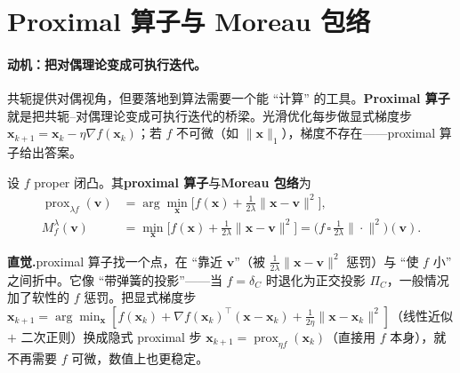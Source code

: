 \section{Proximal 算子与 Moreau 包络}
\label{sec:cvx-prox}

\paragraph{动机：把对偶理论变成可执行迭代。}
共轭提供对偶视角，但要落地到算法需要一个能 “计算” 的工具。\textbf{Proximal 算子}就是把共轭--对偶理论变成可执行迭代的桥梁。光滑优化每步做显式梯度步 $\mathbf x_{k+1}=\mathbf x_k-\eta\nabla f(\mathbf x_k)$；若 $f$ 不可微（如 $\|\mathbf x\|_1$），梯度不存在——proximal 算子给出答案。

\begin{definition}\label{def:prox}
设 $f$ proper 闭凸。其\textbf{proximal 算子}与\textbf{Moreau 包络}为
\begin{align}
  \operatorname{prox}_{\lambda f}(\mathbf v)&=\arg\min_{\mathbf x}\Big[f(\mathbf x)+\frac1{2\lambda}\|\mathbf x-\mathbf v\|^2\Big],\label{eq:prox-def}\\
  M_f^\lambda(\mathbf v)&=\min_{\mathbf x}\Big[f(\mathbf x)+\frac1{2\lambda}\|\mathbf x-\mathbf v\|^2\Big]=\big(f\,\square\,\tfrac1{2\lambda}\|\cdot\|^2\big)(\mathbf v).\label{eq:moreau-def}
\end{align}
\end{definition}

\noindent\textbf{直觉.}\;proximal 算子找一个点，在 “靠近 $\mathbf v$”（被 $\tfrac1{2\lambda}\|\mathbf x-\mathbf v\|^2$ 惩罚）与 “使 $f$ 小” 之间折中。它像 “带弹簧的投影”——当 $f=\delta_C$ 时退化为正交投影 $\Pi_C$，一般情况加了软性的 $f$ 惩罚。把显式梯度步 $\mathbf x_{k+1}=\arg\min_{\mathbf x}[f(\mathbf x_k)+\nabla f(\mathbf x_k)^\top(\mathbf x-\mathbf x_k)+\tfrac1{2\eta}\|\mathbf x-\mathbf x_k\|^2]$（线性近似 $+$ 二次正则）换成隐式 proximal 步 $\mathbf x_{k+1}=\operatorname{prox}_{\eta f}(\mathbf x_k)$（直接用 $f$ 本身），就不再需要 $f$ 可微，数值上也更稳定。

